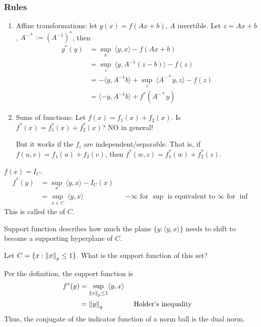 \documentclass[class=article,crop=false]{standalone}
\begin{document}
\subsubsection{Rules}
\begin{enumerate}[label=\arabic*)]
	\item Affine transformations: let $ g(x) = f(Ax+b)$,  $ A$ invertible. Let $ z=Ax+b$, $ A^{-*}:= \left( A^{-1} \right)^*$, then
		 \begin{align*}
			 g^* (y) &= \sup_{x}\ \langle y,x \rangle - f(Ax+b) \\
				 &= \sup_z\ \langle y, A^{-1}(z-b) \rangle - f(z) \\
				 &= -\langle y,A^{-1}b \rangle + \sup_z\ \langle A^{-*}y,z \rangle -f(z) \\
				 &= \langle -y,A^{-1}b \rangle + f^* (A^{-*}y)
		\end{align*}

	\item Sums of functions: Let $ f(x) = f_1(x) + f_2(x)$. Is $ f^* (x) = f_1^* (x) + f_2^* (x)$? NO in general!

		But it works if the $ f_i$ are independent/separable. That is, if $ f(u,v) = f_1(u) + f_2(v)$, then $ f^* (w,z) = f_1^* (w)+ f_2^* (z)$.
\end{enumerate}
\begin{eg}
$ f(x) = I_C$.
\begin{align*}
	f^* (y) &= \sup_x\ \langle y,x \rangle - I_C(x) \\
		&= \sup_{x \in C}\ \langle y,x \rangle && -\infty \text{ for } \sup \text{ is equivalent to }\infty \text{ for }\inf  
\end{align*}
This is called the  of $ C$. 
\begin{remark}
Support function describes how much the plane $\{y:\langle y,x \rangle\}$ needs to shift to become a supporting hyperplane of $C$. 
\end{remark}
\end{eg}
\begin{ques}
	Let $ C = \{x: {\left\lVert{ x}\right\rVert}_p \leq 1 \} $. What is the support function of this set?
\end{ques}
Per the definition, the support function is
\begin{align*}
	f^* (y) &= \sup_{{\left\lVert{ x}\right\rVert}_p \leq 1} \langle y,x \rangle\\
		&= {\left\lVert{ y}\right\rVert}_{q}  && \text{ Holder's inequality}  
\end{align*}
Thus, the conjugate of the indicator function of a norm ball is the dual norm.
\end{document}
